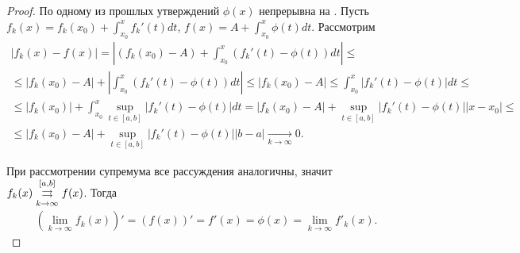 \documentclass[../main.tex]{subfiles}
\begin{document}
 
 \begin{proof}
   По одному из прошлых утверждений $ \phi(x)$ непрерывна на \segab. Пусть $ f_k(x)  = f_k (x_0 ) + \int_{x_0 }^{x} f_k ' (t) dt$, $ f(x) = A + \int_{x_0 }^{x} \phi (t) dt$. Рассмотрим 
   \begin{multline} 
     \left| f_k(x) - f(x)  \right| = \left| \left(f_k (x_0) - A\right) + \int_{x_0 }^{x} (f_k '(t) - \phi(t))dt\right|  \leq \\ \leq \left|f_k (x_0) - A\right|+ \left|\int_{x_0 }^{x} (f_k '(t) - \phi(t))dt\right| \leq \left| f_k (x_0) - A \right|  \leq \int_{x_0 }^{x} \left| f_k ' (t) - \phi (t) \right| dt \leq \\ \leq \left| f_k (x_0) \right|  + \int_{x_0 }^{x} \sup_{t \in [a, b]} \left| f_k '(t) - \phi (t) \right| dt = \left| f_k (x_0) - A \right| + \sup_{t \in [a, b]} \left| f_k'(t) - \phi(t) \right|  \left| x - x_0  \right| \leq \\ \leq \left| f_k (x_0) - A \right| + \sup_{t\in[a,b]} \left| f_k '(t) - \phi(t) \right| \left| b - a \right|  \xrightarrow[k \to  \infty ]{} 0 .
   \end{multline} 

   При рассмотрении супремума все рассуждения аналогичны, значит $ f_k(x)  \convergesuniformly{k \to \infty}{[a,b]} f(x) $. Тогда 
   \begin{gather} 
     \left(\lim_{k \to \infty} f_k(x) \right)' = (f(x))' = f'(x) = \phi(x) = \lim_{k \to \infty} f'_k (x) .
   \end{gather}  

 \end{proof}
 
\end{document}
